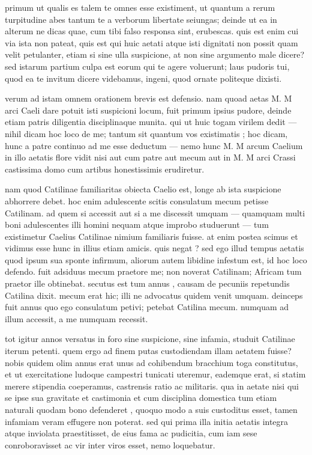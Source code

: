 primum ut qualis es talem te omnes esse existiment, ut quantum a rerum turpitudine abes tantum te a verborum libertate seiungas; deinde ut ea in alterum ne dicas quae, cum tibi falso responsa sint, erubescas. quis est enim cui via ista non pateat, quis est qui huic aetati atque isti dignitati non possit quam velit petulanter, etiam si sine ulla suspicione, at non sine argumento male dicere? sed istarum partium culpa est eorum qui te agere voluerunt; laus pudoris tui, quod ea te invitum dicere videbamus, ingeni, quod ornate politeque dixisti.

 verum ad istam omnem orationem brevis est defensio. nam quoad aetas M. M arci Caeli dare potuit isti suspicioni locum, fuit primum ipsius pudore, deinde etiam patris diligentia disciplinaque munita. qui ut huic togam virilem dedit — nihil dicam hoc loco de me; tantum sit quantum vos existimatis ; hoc dicam, hunc a patre continuo ad me esse deductum — nemo hunc M. M arcum Caelium in illo aetatis flore vidit nisi aut cum patre aut mecum aut in M. M arci Crassi castissima domo cum artibus honestissimis erudiretur.

 nam quod Catilinae familiaritas obiecta Caelio est, longe ab ista suspicione abhorrere debet. hoc enim adulescente scitis consulatum mecum petisse Catilinam. ad quem si accessit aut si a me discessit umquam — quamquam multi boni adulescentes illi homini nequam atque improbo studuerunt — tum existimetur Caelius Catilinae nimium familiaris fuisse. at enim postea scimus et vidimus esse hunc in illius etiam amicis. quis negat ? sed ego illud tempus aetatis quod ipsum sua sponte infirmum, aliorum autem libidine infestum est, id hoc loco defendo. fuit adsiduus mecum praetore me; non noverat Catilinam; Africam tum praetor ille obtinebat. secutus est tum annus , causam de pecuniis repetundis Catilina dixit. mecum erat hic; illi ne advocatus quidem venit umquam. deinceps fuit annus quo ego consulatum petivi; petebat Catilina mecum. numquam ad illum accessit, a me numquam recessit.

 tot igitur annos versatus in foro sine suspicione, sine infamia, studuit Catilinae iterum petenti. quem ergo ad finem putas custodiendam illam aetatem fuisse? nobis quidem olim annus erat unus ad cohibendum bracchium toga constitutus, et ut exercitatione ludoque campestri tunicati uteremur, eademque erat, si statim merere stipendia coeperamus, castrensis ratio ac militaris. qua in aetate nisi qui se ipse sua gravitate et castimonia et cum disciplina domestica tum etiam naturali quodam bono defenderet , quoquo modo a suis custoditus esset, tamen infamiam veram effugere non poterat. sed qui prima illa initia aetatis integra atque inviolata praestitisset, de eius fama ac pudicitia, cum iam sese conroboravisset ac vir inter viros esset, nemo loquebatur.

